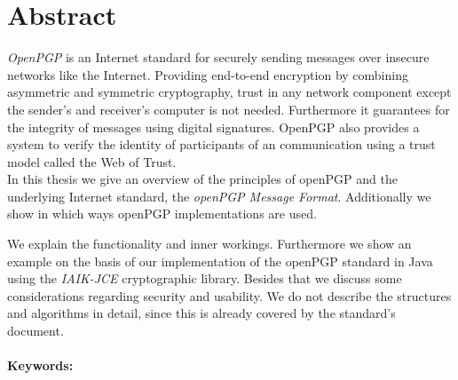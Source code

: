 

\chapter*{Abstract}
\label{cha:abstract}


\emph{OpenPGP} is an Internet standard for securely sending messages over insecure networks like the Internet. Providing end-to-end encryption by combining asymmetric and symmetric cryptography, trust in any network component except the sender's and receiver's computer is not needed. Furthermore it guarantees for the integrity of messages using digital signatures. OpenPGP also provides a system to verify the identity of participants of an communication using a trust model called the Web of Trust. \\


In this thesis we give an overview of the principles of openPGP and the underlying Internet standard, the \textit{openPGP Message Format}. 
Additionally we show in which ways openPGP implementations are used.

We explain the functionality and inner workings. Furthermore we show an example on the basis of our implementation of the openPGP standard in Java using the \emph{IAIK-JCE} cryptographic library.
Besides that we discuss some considerations regarding security and usability. 
We do not describe the structures and algorithms in detail, since this is already covered by the standard's document. \\
\\



\textbf{Keywords:} \mykeywords

